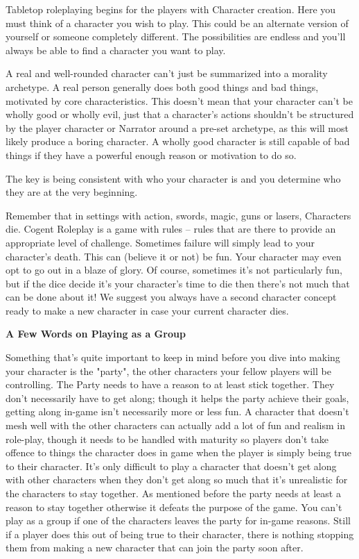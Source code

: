 Tabletop roleplaying begins for the players with Character creation. Here you must think of a character you wish to play. This could be an alternate version of yourself or someone completely different. The possibilities are endless and you’ll always be able to find a character you want to play.

A real and well-rounded character can’t just be summarized into a morality archetype. A real person generally does both good things and bad things, motivated by core characteristics. This doesn’t mean that your character can’t be wholly good or wholly evil, just that a character’s actions shouldn’t be structured by the player character or Narrator around a pre-set archetype, as this will most likely produce a boring character. A wholly good character is still capable of bad things if they have a powerful enough reason or motivation to do so.

The key is being consistent with who your character is and you determine who they are at the very beginning.

Remember that in settings with action, swords, magic, guns or lasers, Characters die. Cogent Roleplay is a game with rules – rules that are there to provide an appropriate level of challenge. Sometimes failure will simply lead to your character’s death. This can (believe it or not) be fun. Your character may even opt to go out in a blaze of glory. Of course, sometimes it’s not particularly fun, but if the dice decide it’s your character's time to die then there’s not much that can be done about it! We suggest you always have a second character concept ready to make a new character in case your current character dies.

\begin{displayquote}
\textbf{A Few Words on Playing as a Group}

Something that's quite important to keep in mind before you dive into making your character is the "party", the other characters your fellow players will be controlling. The Party needs to have a reason to at least stick together. They don't necessarily have to get along; though it helps the party achieve their goals, getting along in-game isn't necessarily more or less fun. A character 
that doesn't mesh well with the other characters can actually add a lot of fun and realism in role-play, though it needs to be handled with maturity so players don't take offence to things the character does in game when the player is simply being true to their character. It's only difficult to play a character that doesn't get along with other characters when they don't get along so much that it's unrealistic for the characters to stay together. As mentioned before the party needs at least a reason to stay together otherwise it defeats the purpose of the game. You can't play as a group if one of the characters leaves the party for in-game reasons. Still if a player does this out of being true to their character, there is nothing stopping them from making a new character that can join the party soon after.
\end{displayquote}

